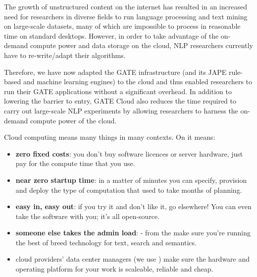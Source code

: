 
\nnormalsize


The growth of unstructured content on the internet has resulted in an increased need 
for researchers in diverse fields to run language processing and text mining on 
large-scale datasets, many of which are impossible to process in reasonable time on 
standard desktops. However, in order to take advantage of the on-demand compute 
power and data storage on the cloud, NLP researchers currently have to re-write/adapt 
their algorithms. 

Therefore, we have now adapted the GATE infrastructure 
(and its JAPE rule-based and machine learning engines) to the cloud and thus enabled 
researchers to run their GATE applications without a significant overhead. 
In addition to lowering the barrier to entry, GATE Cloud also reduces the time 
required to carry out large-scale NLP experiments by allowing researchers to 
harness the on-demand compute power of the cloud. 

Cloud computing means many things in many contexts. On  it
means:

\begin{itemize}
\item {\bf zero fixed costs}: you don't buy software licences or server hardware, just
  pay for the compute time that you use.
\item {\bf near zero startup time}: in a matter of minutes you can specify, provision
  and deploy the type of computation that used to take months of planning.
\item {\bf easy in, easy out}: if you try it and don't like it, go elsewhere! You can
  even take the software with you; it's all open-source.
\item {\bf someone else takes the admin load}:
  -  from the 
     make sure you're running the best of breed
    technology for text, search and semantics.
\item cloud providers' data center managers (we use 
    ) make sure the hardware and operating platform for your work
    is scaleable, reliable and cheap.
\end{itemize}

